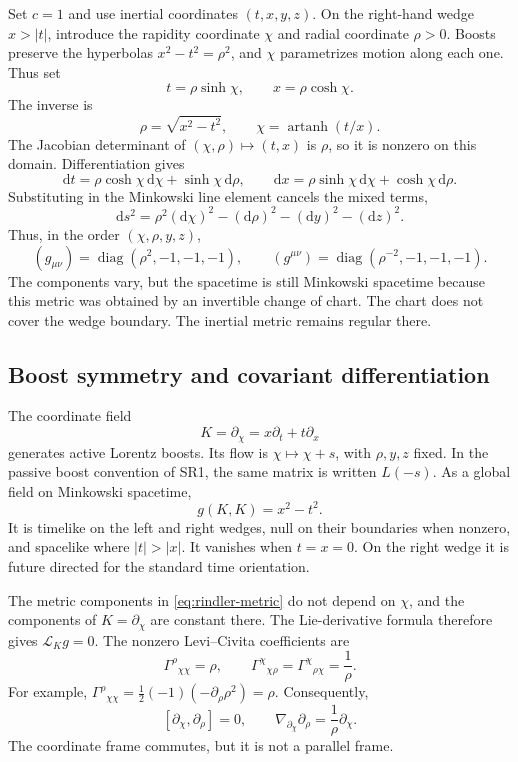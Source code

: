 \documentclass[11pt,a4paper]{article}
\numberwithin{equation}{section}
\newcommand{\dd}{\mathrm d}
\newcommand{\Lie}{\mathcal L}
\begin{document}
Set \(c=1\) and use inertial coordinates \((t,x,y,z)\). On the right-hand
wedge \(x>|t|\), introduce the rapidity coordinate \(\chi\) and radial
coordinate \(\rho>0\). Boosts preserve the hyperbolas
\(x^2-t^2=\rho^2\), and \(\chi\) parametrizes motion along each one.
Thus set
\begin{equation}
 t=\rho\sinh\chi,\qquad x=\rho\cosh\chi.
 \label{eq:boost-coordinates}
\end{equation}
The inverse is
\[
 \rho=\sqrt{x^2-t^2},\qquad
 \chi=\operatorname{artanh}(t/x).
\]
The Jacobian determinant of \((\chi,\rho)\mapsto(t,x)\) is \(\rho\), so it
is nonzero on this domain. Differentiation gives
\[
 \dd t=\rho\cosh\chi\,\dd\chi+\sinh\chi\,\dd\rho,\qquad
 \dd x=\rho\sinh\chi\,\dd\chi+\cosh\chi\,\dd\rho.
\]
Substituting in the Minkowski line element cancels the mixed terms,
\begin{equation}
 \dd s^2=\rho^2(\dd\chi)^2-(\dd\rho)^2-(\dd y)^2-(\dd z)^2.
 \label{eq:rindler-metric}
\end{equation}
Thus, in the order \((\chi,\rho,y,z)\),
\[
 (g_{\mu\nu})=\operatorname{diag}(\rho^2,-1,-1,-1),\qquad
 (g^{\mu\nu})=\operatorname{diag}(\rho^{-2},-1,-1,-1).
\]
The components vary, but the spacetime is still Minkowski spacetime because
this metric was obtained by an invertible change of chart. The chart does
not cover the wedge boundary. The inertial metric remains regular there.

\subsection{Boost symmetry and covariant differentiation}

The coordinate field
\[
 K=\partial_\chi=x\partial_t+t\partial_x
\]
generates active Lorentz boosts. Its flow is \(\chi\mapsto\chi+s\), with
\(\rho,y,z\) fixed. In the passive boost convention of SR1, the same
matrix is written \(L(-s)\). As a global field on Minkowski spacetime,
\[
 g(K,K)=x^2-t^2.
\]
It is timelike on the left and right wedges, null on their boundaries when
nonzero, and spacelike where \(|t|>|x|\). It vanishes when \(t=x=0\).
On the right wedge it is future directed for the standard time orientation.

The metric components in \eqref{eq:rindler-metric} do not depend on
\(\chi\), and the components of \(K=\partial_\chi\) are constant there.
The Lie-derivative formula therefore gives \(\Lie_Kg=0\).
The nonzero Levi--Civita coefficients are
\begin{equation}
 \Gamma^\rho{}_{\chi\chi}=\rho,\qquad
 \Gamma^\chi{}_{\chi\rho}=\Gamma^\chi{}_{\rho\chi}=\frac1\rho.
 \label{eq:rindler-gamma}
\end{equation}
For example,
\(\Gamma^\rho{}_{\chi\chi}
=\tfrac12(-1)(-\partial_\rho\rho^2)=\rho\).
Consequently,
\[
 [\partial_\chi,\partial_\rho]=0,
 \qquad \nabla_{\partial_\chi}\partial_\rho=\frac1\rho\partial_\chi.
\]
The coordinate frame commutes, but it is not a parallel frame.
\end{document}
